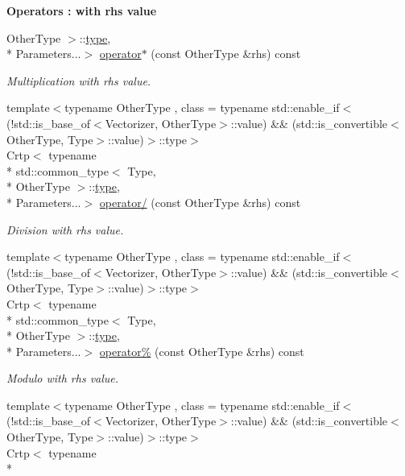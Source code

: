 \begin{Indent}{\bf Operators \-: with rhs value}
\begin{DoxyCompactItemize}
Other\-Type $>$\-::\hyperlink{classmagrathea_1_1StaticVectorizer_a28c393a3896a3e839008c35d56b10a54}{type}, \\*
Parameters...$>$ \hyperlink{classmagrathea_1_1StaticVectorizer_ab2d4e3fb0273c6453f4c77654ed39bee}{operator$\ast$} (const Other\-Type \&rhs) const 
\begin{DoxyCompactList}\small\item\em Multiplication with rhs value. \end{DoxyCompactList}\item 
{\footnotesize template$<$typename Other\-Type , class  = typename std\-::enable\-\_\-if$<$(!std\-::is\-\_\-base\-\_\-of$<$\-Vectorizer, Other\-Type$>$\-::value) \&\& (std\-::is\-\_\-convertible$<$\-Other\-Type, Type$>$\-::value)$>$\-::type$>$ }\\Crtp$<$ typename \\*
std\-::common\-\_\-type$<$ Type, \\*
Other\-Type $>$\-::\hyperlink{classmagrathea_1_1StaticVectorizer_a28c393a3896a3e839008c35d56b10a54}{type}, \\*
Parameters...$>$ \hyperlink{classmagrathea_1_1StaticVectorizer_abb4d2416e7104066405671d4d6d62337}{operator/} (const Other\-Type \&rhs) const 
\begin{DoxyCompactList}\small\item\em Division with rhs value. \end{DoxyCompactList}\item 
{\footnotesize template$<$typename Other\-Type , class  = typename std\-::enable\-\_\-if$<$(!std\-::is\-\_\-base\-\_\-of$<$\-Vectorizer, Other\-Type$>$\-::value) \&\& (std\-::is\-\_\-convertible$<$\-Other\-Type, Type$>$\-::value)$>$\-::type$>$ }\\Crtp$<$ typename \\*
std\-::common\-\_\-type$<$ Type, \\*
Other\-Type $>$\-::\hyperlink{classmagrathea_1_1StaticVectorizer_a28c393a3896a3e839008c35d56b10a54}{type}, \\*
Parameters...$>$ \hyperlink{classmagrathea_1_1StaticVectorizer_abed2e71709a1266c0aa35ace9e60db9c}{operator\%} (const Other\-Type \&rhs) const 
\begin{DoxyCompactList}\small\item\em Modulo with rhs value. \end{DoxyCompactList}\item 
{\footnotesize template$<$typename Other\-Type , class  = typename std\-::enable\-\_\-if$<$(!std\-::is\-\_\-base\-\_\-of$<$\-Vectorizer, Other\-Type$>$\-::value) \&\& (std\-::is\-\_\-convertible$<$\-Other\-Type, Type$>$\-::value)$>$\-::type$>$ }\\Crtp$<$ typename \\*

\end{DoxyCompactItemize}
\end{Indent}
